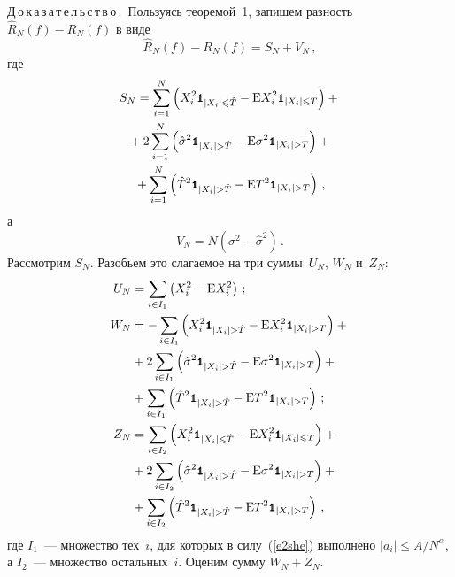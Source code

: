 \begin{multicols}{2}
\medskip

\noindent
Д\,о\,к\,а\,з\,а\,т\,е\,л\,ь\,с\,т\,в\,о\,.\ Пользуясь теоремой~1, запишем разность $\widehat{R}_N(f)-R_N(f)$ в виде
$$
\widehat{R}_N(f)-R_N(f)=S_N+V_N\,,
$$
где
\begin{multline*}
S_N=\sum_{i=1}^{N}\left(X_i^2\Ik_{|X_i|\leqslant \hat{T}}-\mbox{E}X_i^2\Ik_{|X_i|\leqslant T}\right)+{}\\
{}+2\sum_{i=1}^{N}\left(\hat{\sigma}^2\Ik_{|X_i|> \hat{T}}-\mbox{E}\sigma^2\Ik_{|X_i|> T}\right)+{}\\
{}+\sum_{i=1}^{N}\left(\hat{T}^2\Ik_{|X_i|> \hat{T}}-\mbox{E}T^2\Ik_{|X_i|> T}\right)\,,
\end{multline*}
а
$$V_N=N\left(\sigma^2-\hat{\sigma}^2\right)\,.
$$
Рассмотрим $S_N$. Разобьем это слагаемое на три суммы~$U_N$, $W_N$ и~$Z_N$:
\begin{align*}
U_N&=\sum_{i\in I_1}\left(X_i^2-\mbox{E}X_i^2\right)\,;\\
W_N&=-\sum_{i\in I_1}\left(X_i^2\Ik_{|X_i|> \hat{T}}-\mbox{E}X_i^2\Ik_{|X_i|>T}\right)+{}\\
&{}+2\sum_{i\in I_1}\left(\hat{\sigma}^2\Ik_{|X_i|> \hat{T}}-\mbox{E}\sigma^2\Ik_{|X_i|> T}\right)+{}\\
&{}+ \sum_{i\in I_1}\left(\hat{T}^2\Ik_{|X_i|> \hat{T}}-\mbox{E}T^2\Ik_{|X_i|> T}\right)\,;\\
Z_N&=\sum_{i\in I_2}\left(X_i^2\Ik_{|X_i|\leqslant \hat{T}}-\mbox{E}X_i^2\Ik_{|X_i|\leqslant T}\right)+{}\\
&{}+2\sum_{i\in I_2}\left(\hat{\sigma}^2\Ik_{|X_i|> \hat{T}}-\mbox{E}\sigma^2\Ik_{|X_i|> T}\right)+{}\\
&{}+\sum_{i\in I_2}\left(\hat{T}^2\Ik_{|X_i|> \hat{T}}-\mbox{E}T^2\Ik_{|X_i|> T}\right)\,,
\end{align*}
где $I_1$~--- множество тех~$i$, для которых в силу~(\ref{e2she}) выполнено $|a_i|\leqslant{A}/{N^\alpha}$, а 
$I_2$~--- множество остальных~$i$. Оценим сумму $W_N+Z_N$.


\end{multicols}

